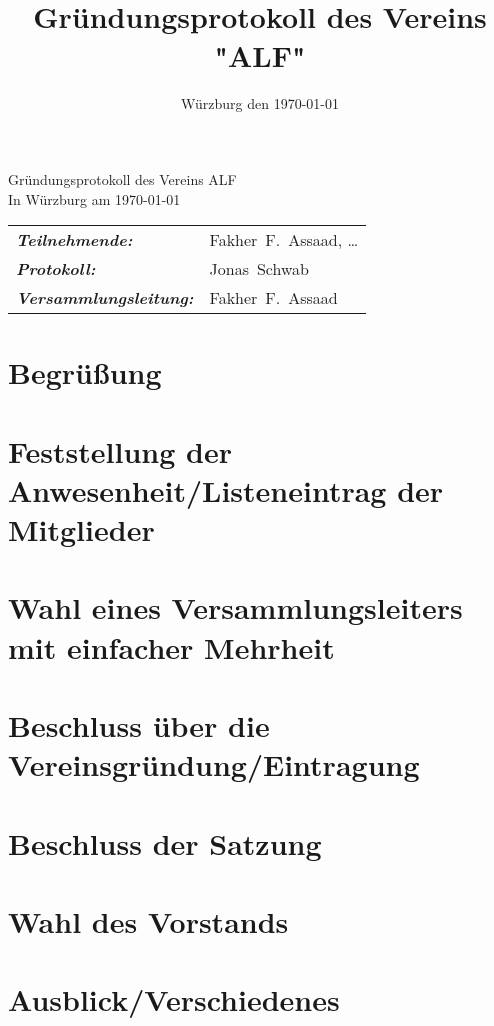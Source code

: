 \documentclass[a4paper,german,12pt]{scrartcl}
\title{Gründungsprotokoll des Vereins "ALF"}
\author{}
\date{Würzburg den \today}
\begin{document}
\renewcommand{\contentsname}{Tagesordnungspunkte}
\begin{center}
{\huge Gründungsprotokoll des Vereins \glqq ALF\grqq\\ In Würzburg am \today}\bigskip %

\begin{tabular}{>{\bfseries \itshape}m{}p{}}
Teilnehmende:  & 
Fakher~F.~Assaad,
\dots
\\ 
Protokoll: & Jonas~Schwab
\\
Versammlungsleitung: & Fakher~F.~Assaad

\end{tabular}
\end{center}
\tableofcontents %

\section{Begrüßung}

\section{Feststellung der Anwesenheit/Listeneintrag der Mitglieder}

\section{Wahl eines Versammlungsleiters mit einfacher Mehrheit}

\section{Beschluss über die Vereinsgründung/Eintragung}

\section{Beschluss der Satzung}

\section{Wahl des Vorstands}

\section{Ausblick/Verschiedenes}
\end{document}
